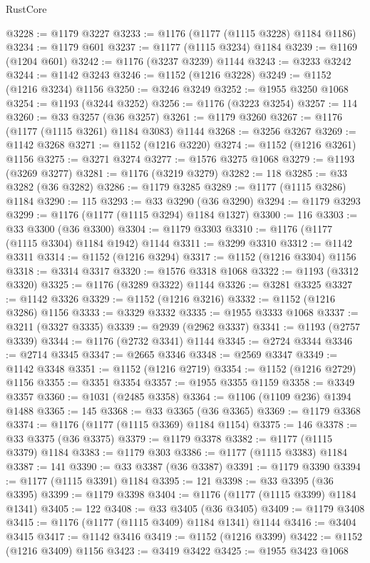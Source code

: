\begin{lexlean}{RustCore}
\begin{coremodule}
@3228 := @1179 @3227
@3233 := @1176 (@1177 (@1115 @3228) @1184 @1186)
@3234 := @1179 @601
@3237 := @1177 (@1115 @3234) @1184
@3239 := @1169 (@1204 @601)
@3242 := @1176 (@3237 @3239) @1144
@3243 := @3233 @3242
@3244 := @1142 @3243
@3246 := @1152 (@1216 @3228)
@3249 := @1152 (@1216 @3234) @1156
@3250 := @3246 @3249
@3252 := @1955 @3250 @1068
@3254 := @1193 (@3244 @3252)
@3256 := @1176 (@3223 @3254)
@3257 := 114
@3260 := @33 @3257 (@36 @3257)
@3261 := @1179 @3260
@3267 := @1176 (@1177 (@1115 @3261) @1184 @3083) @1144
@3268 := @3256 @3267
@3269 := @1142 @3268
@3271 := @1152 (@1216 @3220)
@3274 := @1152 (@1216 @3261) @1156
@3275 := @3271 @3274
@3277 := @1576 @3275 @1068
@3279 := @1193 (@3269 @3277)
@3281 := @1176 (@3219 @3279)
@3282 := 118
@3285 := @33 @3282 (@36 @3282)
@3286 := @1179 @3285
@3289 := @1177 (@1115 @3286) @1184
@3290 := 115
@3293 := @33 @3290 (@36 @3290)
@3294 := @1179 @3293
@3299 := @1176 (@1177 (@1115 @3294) @1184 @1327)
@3300 := 116
@3303 := @33 @3300 (@36 @3300)
@3304 := @1179 @3303
@3310 := @1176 (@1177 (@1115 @3304) @1184 @1942) @1144
@3311 := @3299 @3310
@3312 := @1142 @3311
@3314 := @1152 (@1216 @3294)
@3317 := @1152 (@1216 @3304) @1156
@3318 := @3314 @3317
@3320 := @1576 @3318 @1068
@3322 := @1193 (@3312 @3320)
@3325 := @1176 (@3289 @3322) @1144
@3326 := @3281 @3325
@3327 := @1142 @3326
@3329 := @1152 (@1216 @3216)
@3332 := @1152 (@1216 @3286) @1156
@3333 := @3329 @3332
@3335 := @1955 @3333 @1068
@3337 := @3211 (@3327 @3335)
@3339 := @2939 (@2962 @3337)
@3341 := @1193 (@2757 @3339)
@3344 := @1176 (@2732 @3341) @1144
@3345 := @2724 @3344
@3346 := @2714 @3345
@3347 := @2665 @3346
@3348 := @2569 @3347
@3349 := @1142 @3348
@3351 := @1152 (@1216 @2719)
@3354 := @1152 (@1216 @2729) @1156
@3355 := @3351 @3354
@3357 := @1955 @3355 @1159
@3358 := @3349 @3357
@3360 := @1031 (@2485 @3358)
@3364 := @1106 (@1109 @236) @1394 @1488
@3365 := 145
@3368 := @33 @3365 (@36 @3365)
@3369 := @1179 @3368
@3374 := @1176 (@1177 (@1115 @3369) @1184 @1154)
@3375 := 146
@3378 := @33 @3375 (@36 @3375)
@3379 := @1179 @3378
@3382 := @1177 (@1115 @3379) @1184
@3383 := @1179 @303
@3386 := @1177 (@1115 @3383) @1184
@3387 := 141
@3390 := @33 @3387 (@36 @3387)
@3391 := @1179 @3390
@3394 := @1177 (@1115 @3391) @1184
@3395 := 121
@3398 := @33 @3395 (@36 @3395)
@3399 := @1179 @3398
@3404 := @1176 (@1177 (@1115 @3399) @1184 @1341)
@3405 := 122
@3408 := @33 @3405 (@36 @3405)
@3409 := @1179 @3408
@3415 := @1176 (@1177 (@1115 @3409) @1184 @1341) @1144
@3416 := @3404 @3415
@3417 := @1142 @3416
@3419 := @1152 (@1216 @3399)
@3422 := @1152 (@1216 @3409) @1156
@3423 := @3419 @3422
@3425 := @1955 @3423 @1068

\end{coremodule}
\end{lexlean}
